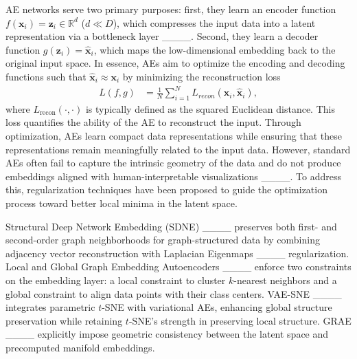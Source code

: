 AE networks serve two primary purposes: first, they learn an encoder function \( f(\mathbf{x}_i) = \mathbf{z}_i \in \mathbb{R}^d \) (\( d \ll D \)), which compresses the input data into a latent representation via a bottleneck layer ____. Second, they learn a decoder function \( g(\mathbf{z}_i) = \hat{\mathbf{x}}_i \), which maps the low-dimensional embedding back to the original input space. In essence, AEs aim to optimize the encoding and decoding functions such that \( \hat{\mathbf{x}}_i \approx \mathbf{x}_i \) by minimizing the reconstruction loss
\begin{align*}
    L(f, g) &= \frac{1}{N} \sum_{i=1}^N L_{recon}(\mathbf{x}_i, \hat{\mathbf{x}}_i),
\end{align*}
where \( L_{\text{recon}}(\cdot, \cdot) \) is typically defined as the squared Euclidean distance. This loss quantifies the ability of the AE to reconstruct the input. Through optimization, AEs learn compact data representations while ensuring that these representations remain meaningfully related to the input data. However, standard AEs often fail to capture the intrinsic geometry of the data and do not produce embeddings aligned with human-interpretable visualizations ____. To address this, regularization techniques have been proposed to guide the optimization process toward better local minima in the latent space.

Structural Deep Network Embedding (SDNE) ____ preserves both first- and second-order graph neighborhoods for graph-structured data by combining adjacency vector reconstruction with Laplacian Eigenmaps ____ regularization. Local and Global Graph Embedding Autoencoders ____ enforce two constraints on the embedding layer: a local constraint to cluster \( k \)-nearest neighbors and a global constraint to align data points with their class centers. VAE-SNE ____ integrates parametric $t$-SNE with variational AEs, enhancing global structure preservation while retaining $t$-SNE's strength in preserving local structure. GRAE ____ explicitly impose geometric consistency between the latent space and precomputed manifold embeddings.

